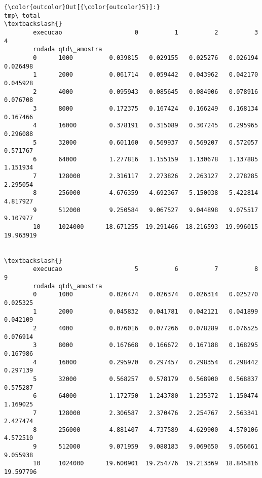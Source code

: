\documentclass[11pt]{article}
\begin{document}
\begin{Verbatim}[commandchars=\\\{\}]
{\color{outcolor}Out[{\color{outcolor}5}]:}                     tmp\_total                                              \textbackslash{}
        execucao                    0          1          2          3          4   
        rodada qtd\_amostra                                                          
        0      1000          0.039815   0.029155   0.025276   0.026194   0.026498   
        1      2000          0.061714   0.059442   0.043962   0.042170   0.045928   
        2      4000          0.095943   0.085645   0.084906   0.078916   0.076708   
        3      8000          0.172375   0.167424   0.166249   0.168134   0.167466   
        4      16000         0.378191   0.315089   0.307245   0.295965   0.296088   
        5      32000         0.601160   0.569937   0.569207   0.572057   0.571767   
        6      64000         1.277816   1.155159   1.130678   1.137885   1.151934   
        7      128000        2.316117   2.273826   2.263127   2.278285   2.295054   
        8      256000        4.676359   4.692367   5.150038   5.422814   4.817927   
        9      512000        9.250584   9.067527   9.044898   9.075517   9.107977   
        10     1024000      18.671255  19.291466  18.216593  19.996015  19.963919   
        
                                                                                   \textbackslash{}
        execucao                    5          6          7          8          9   
        rodada qtd\_amostra                                                          
        0      1000          0.026474   0.026374   0.026314   0.025270   0.025325   
        1      2000          0.045832   0.041781   0.042121   0.041899   0.042109   
        2      4000          0.076016   0.077266   0.078289   0.076525   0.076914   
        3      8000          0.167668   0.166672   0.167188   0.168295   0.167986   
        4      16000         0.295970   0.297457   0.298354   0.298442   0.297139   
        5      32000         0.568257   0.578179   0.568900   0.568837   0.575287   
        6      64000         1.172750   1.243780   1.235372   1.150474   1.169025   
        7      128000        2.306587   2.370476   2.254767   2.563341   2.427474   
        8      256000        4.881407   4.737589   4.629900   4.570106   4.572510   
        9      512000        9.071959   9.088183   9.069650   9.056661   9.055938   
        10     1024000      19.600901  19.254776  19.213369  18.845816  19.597796   
        

\end{Verbatim}
\end{document}
